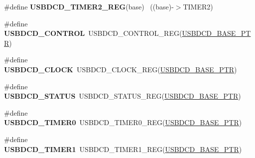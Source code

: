 \begin{DoxyCompactItemize}
\item 
\hypertarget{group___u_s_b_d_c_d___register___accessor___macros_ga0c14ac0966245ae63c84653a5c9ee453}{}\#define {\bfseries U\+S\+B\+D\+C\+D\+\_\+\+T\+I\+M\+E\+R2\+\_\+\+R\+E\+G}(base)                                ~((base)-\/$>$T\+I\+M\+E\+R2)\label{group___u_s_b_d_c_d___register___accessor___macros_ga0c14ac0966245ae63c84653a5c9ee453}

\item 
\hypertarget{group___u_s_b_d_c_d___register___accessor___macros_ga70240dec5113361c1f15695ed389e323}{}\#define {\bfseries U\+S\+B\+D\+C\+D\+\_\+\+C\+O\+N\+T\+R\+O\+L}~U\+S\+B\+D\+C\+D\+\_\+\+C\+O\+N\+T\+R\+O\+L\+\_\+\+R\+E\+G(\hyperlink{group___u_s_b_d_c_d___peripheral_ga6289dc687e9b991508629237aeb61755}{U\+S\+B\+D\+C\+D\+\_\+\+B\+A\+S\+E\+\_\+\+P\+T\+R})\label{group___u_s_b_d_c_d___register___accessor___macros_ga70240dec5113361c1f15695ed389e323}

\item 
\hypertarget{group___u_s_b_d_c_d___register___accessor___macros_ga543817a50fb8eddab8be17eeac66ed2f}{}\#define {\bfseries U\+S\+B\+D\+C\+D\+\_\+\+C\+L\+O\+C\+K}~U\+S\+B\+D\+C\+D\+\_\+\+C\+L\+O\+C\+K\+\_\+\+R\+E\+G(\hyperlink{group___u_s_b_d_c_d___peripheral_ga6289dc687e9b991508629237aeb61755}{U\+S\+B\+D\+C\+D\+\_\+\+B\+A\+S\+E\+\_\+\+P\+T\+R})\label{group___u_s_b_d_c_d___register___accessor___macros_ga543817a50fb8eddab8be17eeac66ed2f}

\item 
\hypertarget{group___u_s_b_d_c_d___register___accessor___macros_gacf092152e7551433538eb6aace1bc43a}{}\#define {\bfseries U\+S\+B\+D\+C\+D\+\_\+\+S\+T\+A\+T\+U\+S}~U\+S\+B\+D\+C\+D\+\_\+\+S\+T\+A\+T\+U\+S\+\_\+\+R\+E\+G(\hyperlink{group___u_s_b_d_c_d___peripheral_ga6289dc687e9b991508629237aeb61755}{U\+S\+B\+D\+C\+D\+\_\+\+B\+A\+S\+E\+\_\+\+P\+T\+R})\label{group___u_s_b_d_c_d___register___accessor___macros_gacf092152e7551433538eb6aace1bc43a}

\item 
\hypertarget{group___u_s_b_d_c_d___register___accessor___macros_ga696142965d4e1a121400c0f9e42e9c30}{}\#define {\bfseries U\+S\+B\+D\+C\+D\+\_\+\+T\+I\+M\+E\+R0}~U\+S\+B\+D\+C\+D\+\_\+\+T\+I\+M\+E\+R0\+\_\+\+R\+E\+G(\hyperlink{group___u_s_b_d_c_d___peripheral_ga6289dc687e9b991508629237aeb61755}{U\+S\+B\+D\+C\+D\+\_\+\+B\+A\+S\+E\+\_\+\+P\+T\+R})\label{group___u_s_b_d_c_d___register___accessor___macros_ga696142965d4e1a121400c0f9e42e9c30}

\item 
\hypertarget{group___u_s_b_d_c_d___register___accessor___macros_gacf474d5bde6a1007416398682f014768}{}\#define {\bfseries U\+S\+B\+D\+C\+D\+\_\+\+T\+I\+M\+E\+R1}~U\+S\+B\+D\+C\+D\+\_\+\+T\+I\+M\+E\+R1\+\_\+\+R\+E\+G(\hyperlink{group___u_s_b_d_c_d___peripheral_ga6289dc687e9b991508629237aeb61755}{U\+S\+B\+D\+C\+D\+\_\+\+B\+A\+S\+E\+\_\+\+P\+T\+R})\label{group___u_s_b_d_c_d___register___accessor___macros_gacf474d5bde6a1007416398682f014768}


\end{DoxyCompactItemize}
